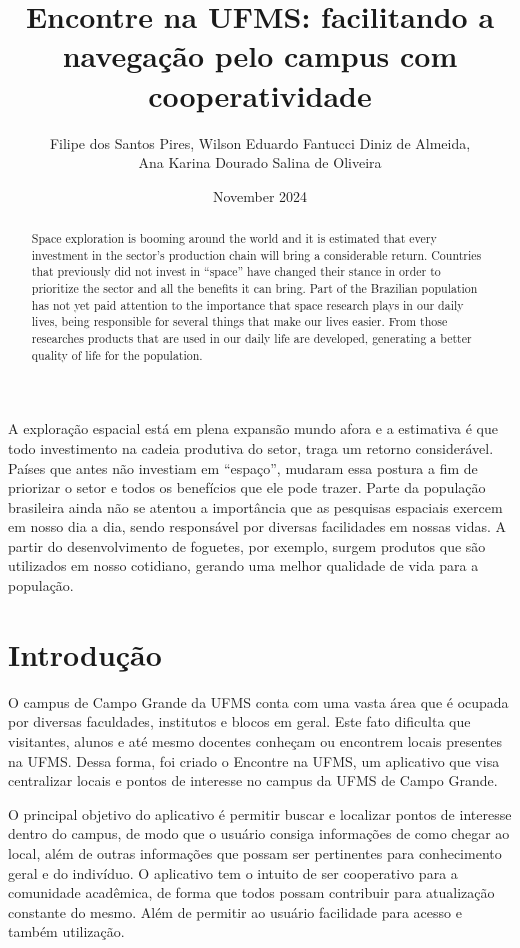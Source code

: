 \documentclass[12pt]{article}
\title{Encontre na UFMS: facilitando a navegação pelo campus com cooperatividade}
\author{Filipe dos Santos Pires\inst{1}, Wilson Eduardo Fantucci Diniz de Almeida\inst{1},\\Ana Karina Dourado Salina de Oliveira\inst{1}}
\date{November 2024}
\begin{document}
\maketitle

\begin{resumo} 
  A exploração espacial está em plena expansão mundo afora e a estimativa é que todo investimento na cadeia produtiva do setor, traga um retorno considerável. Países que antes não investiam em “espaço”, mudaram essa postura a fim de priorizar o setor e todos os benefícios que ele pode trazer.
  Parte da população brasileira ainda não se atentou a importância que as pesquisas espaciais exercem em nosso dia a dia, sendo responsável por diversas facilidades em nossas vidas. A partir do desenvolvimento de foguetes, por exemplo, surgem produtos que são utilizados em nosso cotidiano, gerando uma melhor qualidade de vida para a população.
\end{resumo}

\begin{abstract}
  Space exploration is booming around the world and it is estimated that every investment in the sector's production chain will bring a considerable return. Countries that previously did not invest in “space” have changed their stance in order to prioritize the sector and all the benefits it can bring.
  Part of the Brazilian population has not yet paid attention to the importance that space research plays in our daily lives, being responsible for several things that make our lives easier. From those researches products that are used in our daily life are developed, generating a better quality of life for the population.
\end{abstract}

\section{Introdução}
O campus de Campo Grande da UFMS conta com uma vasta área que é ocupada por diversas faculdades, institutos e blocos em geral. Este fato dificulta que visitantes, alunos e até mesmo docentes conheçam ou encontrem locais presentes na UFMS. Dessa forma, foi criado o Encontre na UFMS, um aplicativo que visa centralizar locais e pontos de interesse no campus da UFMS de Campo Grande.

O principal objetivo do aplicativo é permitir buscar e localizar pontos de interesse dentro do campus, de modo que o usuário consiga informações de como chegar ao local, além de outras informações que possam ser pertinentes para conhecimento geral e do indivíduo. O aplicativo tem o intuito de ser cooperativo para a comunidade acadêmica, de forma que todos possam contribuir para atualização constante do mesmo. Além de permitir ao usuário facilidade para acesso e também utilização.
\end{document}
